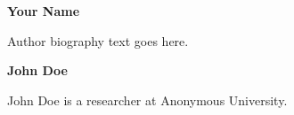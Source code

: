 \documentclass[
  11pt,
  twoside]{book}
\theoremstyle{plain}
\theoremstyle{definition}
\theoremstyle{plain}
\theoremstyle{plain}
\theoremstyle{remark}
\begin{document}
\makeatletter
\let\stdmkboth\@mkboth
\def\@mkboth#1#2{}
\makeatother

\markright{}
\backmatter
\renewcommand\bibname{References}



\vspace*{18pt}
\noindent\textbf{Your Name}\par

Author biography text goes here.\par
\vspace*{18pt}
\noindent\textbf{John Doe}\par

John Doe is a researcher at Anonymous University.\par
\end{document}
